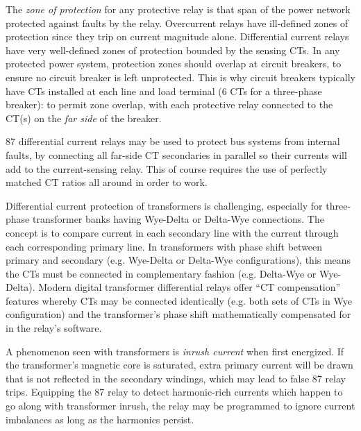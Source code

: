 \vskip 10pt

The {\it zone of protection} for any protective relay is that span of the power network protected against faults by the relay.  Overcurrent relays have ill-defined zones of protection since they trip on current magnitude alone.  Differential current relays have very well-defined zones of protection bounded by the sensing CTs.  In any protected power system, protection zones should overlap at circuit breakers, to ensure no circuit breaker is left unprotected.  This is why circuit breakers typically have CTs installed at each line and load terminal (6 CTs for a three-phase breaker): to permit zone overlap, with each protective relay connected to the CT(s) on the {\it far side} of the breaker.

\vskip 10pt

87 differential current relays may be used to protect bus systems from internal faults, by connecting all far-side CT secondaries in parallel so their currents will add to the current-sensing relay.  This of course requires the use of perfectly matched CT ratios all around in order to work.

\vskip 10pt

Differential current protection of transformers is challenging, especially for three-phase transformer banks having Wye-Delta or Delta-Wye connections.  The concept is to compare current in each secondary line with the current through each corresponding primary line.  In transformers with phase shift between primary and secondary (e.g. Wye-Delta or Delta-Wye configurations), this means the CTs must be connected in complementary fashion (e.g. Delta-Wye or Wye-Delta).  Modern digital transformer differential relays offer ``CT compensation'' features whereby CTs may be connected identically (e.g. both sets of CTs in Wye configuration) and the transformer's phase shift mathematically compensated for in the relay's software. 

\vskip 10pt

A phenomenon seen with transformers is {\it inrush current} when first energized.  If the transformer's magnetic core is saturated, extra primary current will be drawn that is not reflected in the secondary windings, which may lead to false 87 relay trips.  Equipping the 87 relay to detect harmonic-rich currents which happen to go along with transformer inrush, the relay may be programmed to ignore current imbalances as long as the harmonics persist.





